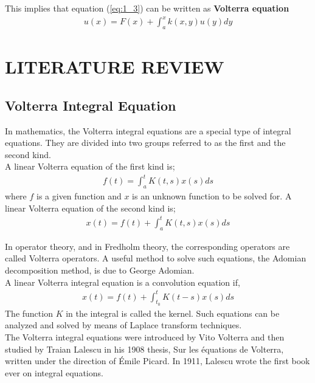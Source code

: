 \documentclass[11pt]{report}
\newcommand{\refn}[1]{(\ref{#1})}
\newcommand{\refx}[1]{\refn{eq:#1}}
\newcommand{\NI}{\noindent}
\begin{document}
	\NI This implies that equation \refx{1_3} can be written as \textbf{Volterra equation}
	\begin{eqnarray}
		u(x) = F(x) + \int_{a}^{x} k(x,y)u(y)dy
	\end{eqnarray}
	
	
		
	\chapter{LITERATURE REVIEW}
	\section{Volterra Integral Equation}
	In mathematics, the Volterra integral equations are a special type of integral equations. They are divided into two groups referred to as the first and the second kind.\\
	
	\NI A linear Volterra equation of the first kind is;
	\begin{eqnarray*}
		f(t) = \int_{a}^{t} K(t, s) x(s) ds
	\end{eqnarray*}
	where $f$ is a given function and $x$ is an unknown function to be solved for. A linear Volterra equation of the second kind is;
	\begin{eqnarray*}
		x(t) = f(t) + \int_{a}^{t} K(t,s) x(s) ds
	\end{eqnarray*}
	
	\NI In operator theory, and in Fredholm theory, the corresponding operators are called Volterra operators. A useful method to solve such equations, the Adomian decomposition method, is due to George Adomian.\\
	A linear Volterra integral equation is a convolution equation if,
	\begin{eqnarray*}
		x(t) = f(t) + \int_{t_{0}}^{t} K(t - s) x(s) ds
	\end{eqnarray*}
	The function $K$ in the integral is called the kernel. Such equations can be analyzed and solved by means of Laplace transform techniques.\\
	
	\NI The Volterra integral equations were introduced by Vito Volterra and then studied by Traian Lalescu in his 1908 thesis, Sur les équations de Volterra, written under the direction of Émile Picard. In 1911, Lalescu wrote the first book ever on integral equations.\\
	
\end{document}
